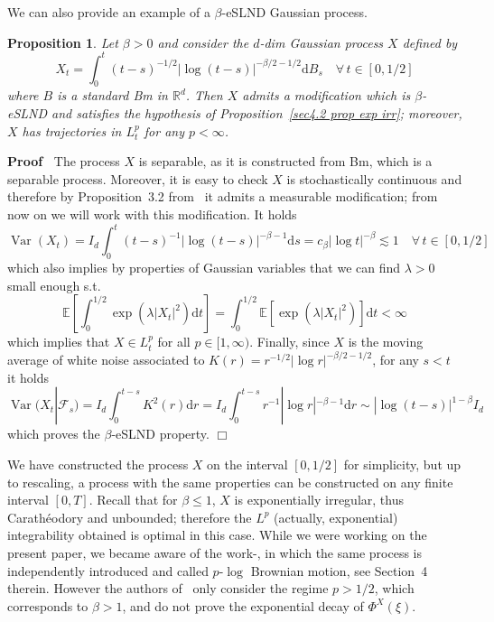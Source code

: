 \documentclass[10pt]{article}
\newcommand{\mathd}{\mathrm{d}}
\newcommand{\nobracket}{}
\newcommand{\tmop}[1]{\ensuremath{\operatorname{#1}}}
\newenvironment{proof}{\noindent\textbf{Proof\ }}{\hspace*{\fill}$\Box$\medskip}
\newtheorem{proposition}[theorem]{Proposition}
{\theorembodyfont{\rmfamily}\newtheorem{remark}[theorem]{Remark}}
\begin{document}
We can also provide an example of a $\beta$\mbox{-}eSLND Gaussian process.

\begin{proposition}
  \label{sec4.2 prop wierd process}Let $\beta > 0$ and consider the
  $d$\mbox{-}dim Gaussian process $X$ defined by
  \begin{equation}
    X_t = \int_0^t (t - s)^{- 1 / 2} | \log (t - s) |^{- \beta / 2 - 1 / 2}
    \mathd B_s \quad \forall \, t \in [0, 1 / 2] \label{sec4.2 wierd process}
  \end{equation}
  where $B$ is a standard Bm in $\mathbb{R}^d$. Then $X$ admits a modification
  which is $\beta$\mbox{-}eSLND and satisfies the hypothesis of
  Proposition~\ref{sec4.2 prop exp irr}; moreover, $X$ has trajectories in
  $L^p_t$ for any $p < \infty$.
\end{proposition}

\begin{proof}
  The process $X$ is separable, as it is constructed from Bm, which is a
  separable process. Moreover, it is easy to check $X$ is stochastically
  continuous and therefore by Proposition~3.2 from~{\cite{daprato}} it admits
  a measurable modification; from now on we will work with this modification.
  It holds
  \[ \tmop{Var} (X_t) = I_d  \int_0^t (t - s)^{- 1} | \log (t - s) |^{- \beta
     - 1} \mathd s = c_{\beta}  | \log t |^{- \beta} \lesssim 1 \quad \forall
     \, t \in [0, 1 / 2] \]
  which also implies by properties of Gaussian variables that we can find
  $\lambda > 0$ small enough s.t.
  \[ \mathbb{E} \left[ \int_0^{1 / 2} \exp (\lambda | X_t |^2) \mathd t
     \right] = \int_0^{1 / 2} \mathbb{E} [\exp (\lambda | X_t |^2)] \mathd t <
     \infty \]
  which implies that $X \in L^p_t$ for all $p \in [1, \infty)$. Finally, since
  $X$ is the moving average of white noise associated to $K (r) = r^{- 1 / 2} 
  | \log r |^{- \beta / 2 - 1 / 2}$, for any $s < t$ it holds
  \[ \tmop{Var} (X_t | \mathcal{F}_s \nobracket) = I_d \int_0^{t - s} K^2 (r)
     \mathd r = I_d \int_0^{t - s} r^{- 1} | \log r |^{- \beta - 1} \mathd r
     \sim | \log (t - s) |^{1 - \beta} I_d \]
  which proves the $\beta$\mbox{-}eSLND property.
\end{proof}

\begin{remark}
  We have constructed the process $X$ on the interval $[0, 1 / 2]$ for
  simplicity, but up to rescaling, a process with the same properties can be
  constructed on any finite interval $[0, T]$. Recall that for $\beta
  \leqslant 1$, $X$ is exponentially irregular, thus Carath{\'e}odory and
  unbounded; therefore the $L^p$ (actually, exponential) integrability
  obtained is optimal in this case. While we were working on the present
  paper, we became aware of the work\mbox{-}{\cite{perkowski}}, in which the
  same process is independently introduced and called $p$\mbox{-}$\log$
  Brownian motion, see Section~4 therein. However the authors
  of~{\cite{perkowski}} only consider the regime $p > 1 / 2$, which
  corresponds to $\beta > 1$, and do not prove the exponential decay of
  $\Phi^X (\xi)$.
\end{remark}
\end{document}
